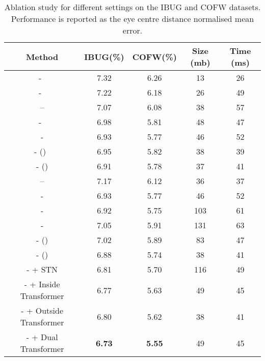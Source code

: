 \documentclass{bmvc2k}
\begin{document}
\begin{table}
\begin{center}
\begin{tabular}{c|c|c|c|c}
\hline
Method                                            & IBUG(\%) & COFW(\%) & Size (mb) & Time (ms)\\
\hline
-~\cite{newell2016stacked}     & 7.32  & 6.26  & 13 & 26 \\
-~\cite{newell2016stacked}     & 7.22  & 6.18  & 26 & 49 \\
\hline
--                    & 7.07  & 6.08  & 38 & 57 \\
-~\cite{bulat2017far}             & 6.98  & 5.81  & 48 & 47 \\
-                                 & 6.93  & 5.77  & 46 & 52 \\    \hline
- ()~\cite{bulat2017far} & 6.95  & 5.82  & 38 & 39 \\ 
- ()                     & 6.91  & 5.78  & 37 & 41 \\
\hline
--                        &  7.17  & 6.12  & 36   & 37\\
-                      &  6.93  & 5.77  & 46   & 52 \\    -                            &  6.92  & 5.75  & 103  & 61\\
   -                   &  7.05  & 5.91  & 131  & 63\\
  - ()           & 7.02  & 5.89  & 83 & 47\\
 - ()           & 6.88  & 5.74  & 38 & 41 \\ 
\hline
- + STN                                                         & 6.81  & 5.70  & 116 & 49\\
- + Inside Transformer                                          & 6.77  & 5.63  & 49 & 45 \\
\hline
- + Outside Transformer                                         & 6.80  & 5.62  & 38 & 41\\
\hline
- + Dual Transformer                                            & {\bf 6.73}  & {\bf 5.55}  & 49 & 45 \\
\hline
\end{tabular}
\end{center}
\vspace{-2mm}
\caption{Ablation study for different settings on the IBUG and COFW datasets. Performance is reported as the eye centre distance normalised mean error.}
\vspace{-4mm}
\label{tab:ablation}
\end{table}
\end{document}
